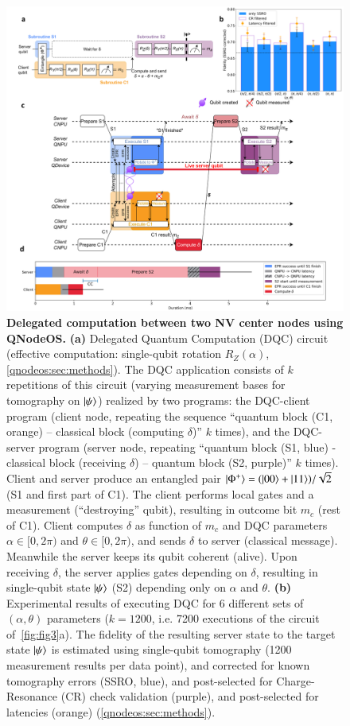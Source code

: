 \begin{figure}[htbp]
\centering
\includegraphics[width=0.89\linewidth]{figures/qnodeos/main/fig3/fig3.png}
\caption{\textbf{Delegated computation between two NV center nodes using QNodeOS.} 
\textbf{(a)} Delegated Quantum Computation (DQC) circuit (effective computation: single-qubit rotation $R_Z (\alpha)$, \cref{qnodeos:sec:methods}). The DQC application consists of $k$ repetitions of this circuit (varying measurement bases for tomography on $\ket{\psi}$) realized by two programs: the DQC-client program (client node, repeating the sequence ``quantum block (C1, orange) – classical block (computing $\delta$)'' $k$ times), and the DQC-server program (server node, repeating ``quantum block (S1, blue) - classical block (receiving $\delta$) – quantum block (S2, purple)'' $k$ times). Client and server produce an entangled pair $\ket{\Phi^+} = (\ket{00} + \ket{11}) / \sqrt{2}$ (S1 and first part of C1). The client performs local gates and a measurement (``destroying'' qubit), resulting in outcome bit $m_c$ (rest of C1). Client computes $\delta$ as function of $m_c$ and DQC parameters $\alpha \in [0,2\pi)$ and $\theta \in [0, 2\pi)$, and sends $\delta$ to server (classical message). Meanwhile the server keeps its qubit coherent (alive). Upon receiving $\delta$, the server applies gates depending on $\delta$, resulting in single-qubit state $\ket{\psi}$ (S2) depending only on $\alpha$ and $\theta$.
\textbf{(b)} Experimental results of executing DQC for 6 different sets of $(\alpha, \theta)$ parameters ($k=1200$, i.e. 7200 executions of the circuit of~\ref{fig:fig3}a). The fidelity of the resulting server state to the target state $\ket{\psi}$ is estimated using single-qubit tomography (1200 measurement results per data point), and corrected for known tomography errors (SSRO, blue), and post-selected for Charge-Resonance (CR) check validation (purple), and post-selected for latencies (orange) (\cref{qnodeos:sec:methods}).
}
\end{figure}
